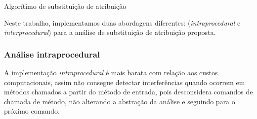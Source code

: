 \begin{algorithm}[h]
    \caption{Algorítimo de substituição de atribuição}
    

    
   
    
    \BlankLine
\end{algorithm}

Neste trabalho, implementamos duas abordagens diferentes: (\emph{intraprocedural} e \emph{interprocedural}) para a análise de substituição de atribuição proposta.

\subsubsection*{Análise intraprocedural}

A implementação \emph{intraprocedural} é mais barata com relação aos custos computacionais, assim não consegue detectar interferências quando ocorrem em métodos chamados a partir do método de entrada, pois desconsidera comandos de chamada de método, não alterando a abstração da análise e seguindo para o próximo comando.

